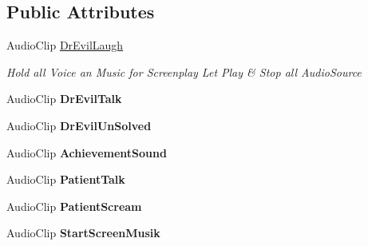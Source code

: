 \subsection*{Public Attributes}
\begin{DoxyCompactItemize}
\item 
Audio\+Clip \mbox{\hyperlink{class_dr_evil_1_1_mechanics_1_1_sound_controller_a1bf0d2d46e1805f3ccd105125f5225f8}{Dr\+Evil\+Laugh}}
\begin{DoxyCompactList}\small\item\em Hold all Voice an Music for Screenplay Let Play \& Stop all Audio\+Source \end{DoxyCompactList}\item 
\mbox{\label{class_dr_evil_1_1_mechanics_1_1_sound_controller_a959aa03e8719b0f737bbc54cf9c98923}} 
Audio\+Clip {\bfseries Dr\+Evil\+Talk}
\item 
\mbox{\label{class_dr_evil_1_1_mechanics_1_1_sound_controller_a11cde4d0283aad25cbe4a4e0cdb126a8}} 
Audio\+Clip {\bfseries Dr\+Evil\+Un\+Solved}
\item 
\mbox{\label{class_dr_evil_1_1_mechanics_1_1_sound_controller_a0c104b73a55f9aca5cdb0da12bb83c04}} 
Audio\+Clip {\bfseries Achievement\+Sound}
\item 
\mbox{\label{class_dr_evil_1_1_mechanics_1_1_sound_controller_aa9c558b3931e6a3dd98090ab7423a5ef}} 
Audio\+Clip {\bfseries Patient\+Talk}
\item 
\mbox{\label{class_dr_evil_1_1_mechanics_1_1_sound_controller_a50c35f4759ed2aab3dd10033922ea524}} 
Audio\+Clip {\bfseries Patient\+Scream}
\item 
\mbox{\label{class_dr_evil_1_1_mechanics_1_1_sound_controller_a2f2b3559e95714516eb45342a994be31}} 
Audio\+Clip {\bfseries Start\+Screen\+Musik}
\item 
\mbox{\label{class_dr_evil_1_1_mechanics_1_1_sound_controller_a1e545c755add6e5287ae2695daa581ce}} 

\end{DoxyCompactItemize}
